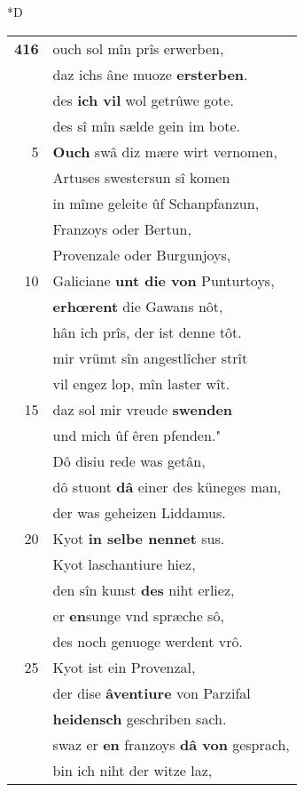 \documentclass[8pt,a4paper,notitlepage]{article}
\begin{document}
\begin{table}[ht]
\begin{minipage}[t]{0.5\linewidth}
\small
\begin{center}*D
\end{center}
\begin{tabular}{rl}
\textbf{416} & ouch sol mîn prîs erwerben,\\ 
 & daz ichs âne muoze \textbf{ersterben}.\\ 
 & des \textbf{ich vil} wol getrûwe gote.\\ 
 & des sî mîn sælde gein im bote.\\ 
5 & \textbf{Ouch} swâ diz mære wirt vernomen,\\ 
 & Artuses swestersun sî komen\\ 
 & in mîme geleite ûf Schanpfanzun,\\ 
 & Franzoys oder Bertun,\\ 
 & Provenzale oder Burgunjoys,\\ 
10 & Galiciane \textbf{unt die von} Punturtoys,\\ 
 & \textbf{erhœrent} die Gawans nôt,\\ 
 & hân ich prîs, der ist denne tôt.\\ 
 & mir vrümt sîn angestlîcher strît\\ 
 & vil engez lop, mîn laster wît.\\ 
15 & daz sol mir vreude \textbf{swenden}\\ 
 & und mich ûf êren pfenden."\\ 
 & Dô disiu rede was getân,\\ 
 & dô stuont \textbf{dâ} einer des küneges man,\\ 
 & der was geheizen Liddamus.\\ 
20 & Kyot \textbf{in selbe nennet} sus.\\ 
 & Kyot laschantiure hiez,\\ 
 & den sîn kunst \textbf{des} niht erliez,\\ 
 & er \textbf{en}sunge vnd spræche sô,\\ 
 & des noch genuoge werdent vrô.\\ 
25 & Kyot ist ein Provenzal,\\ 
 & der dise \textbf{âventiure} von Parzifal\\ 
 & \textbf{heidensch} geschriben sach.\\ 
 & swaz er \textbf{en} franzoys \textbf{dâ von} gesprach,\\ 
 & bin ich niht der witze laz,\\ 

\end{tabular}
\end{minipage}
\end{table}
\end{document}
